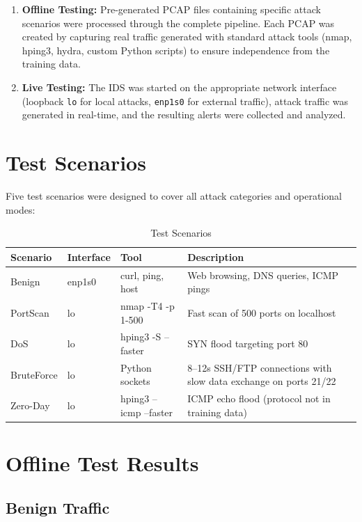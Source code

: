 \documentclass[12pt,a4paper,twoside]{report}
\begin{document}
\begin{enumerate}[leftmargin=*]
    \item \textbf{Offline Testing:} Pre-generated PCAP files containing specific attack scenarios were processed through the complete pipeline. Each PCAP was created by capturing real traffic generated with standard attack tools (nmap, hping3, hydra, custom Python scripts) to ensure independence from the training data.
    \item \textbf{Live Testing:} The IDS was started on the appropriate network interface (loopback \texttt{lo} for local attacks, \texttt{enp1s0} for external traffic), attack traffic was generated in real-time, and the resulting alerts were collected and analyzed.
\end{enumerate}

\section{Test Scenarios}

Five test scenarios were designed to cover all attack categories and operational modes:

\begin{table}[H]
\centering
\caption{Test Scenarios}
\begin{tabularx}{\textwidth}{lllX}
\toprule
\textbf{Scenario} & \textbf{Interface} & \textbf{Tool} & \textbf{Description} \\
\midrule
Benign & enp1s0 & curl, ping, host & Web browsing, DNS queries, ICMP pings \\
PortScan & lo & nmap -T4 -p 1-500 & Fast scan of 500 ports on localhost \\
DoS & lo & hping3 -S --faster & SYN flood targeting port 80 \\
BruteForce & lo & Python sockets & 8--12s SSH/FTP connections with slow data exchange on ports 21/22 \\
Zero-Day & lo & hping3 --icmp --faster & ICMP echo flood (protocol not in training data) \\
\bottomrule
\end{tabularx}
\end{table}

\section{Offline Test Results}

\subsection{Benign Traffic}
\end{document}
